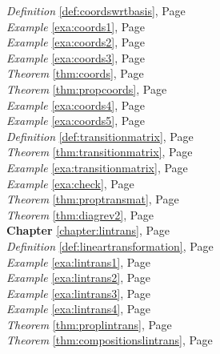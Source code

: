 \begin{multicols}{3}
\begin{center}
      \textit{Definition} \ref{def:coordswrtbasis}, Page \pageref{def:coordswrtbasis} \\
      \textit{Example} \ref{exa:coords1}, Page \pageref{exa:coords1} \\
      \textit{Example} \ref{exa:coords2}, Page \pageref{exa:coords2} \\
      \textit{Example} \ref{exa:coords3}, Page \pageref{exa:coords3} \\
      \textit{Theorem} \ref{thm:coords}, Page \pageref{thm:coords} \\
      \textit{Theorem} \ref{thm:propcoords}, Page \pageref{thm:propcoords} \\
      \textit{Example} \ref{exa:coords4}, Page \pageref{exa:coords4} \\
      \textit{Example} \ref{exa:coords5}, Page \pageref{exa:coords5} \\
      \textit{Definition} \ref{def:transitionmatrix}, Page \pageref{def:transitionmatrix} \\
      \textit{Theorem} \ref{thm:transitionmatrix}, Page \pageref{thm:transitionmatrix} \\
      \textit{Example} \ref{exa:transitionmatrix}, Page \pageref{exa:transitionmatrix} \\
      \textit{Example} \ref{exa:check}, Page \pageref{exa:check} \\
      \textit{Theorem} \ref{thm:proptransmat}, Page \pageref{thm:proptransmat} \\
      \textit{Theorem} \ref{thm:diagrev2}, Page \pageref{thm:diagrev2} \\
      \textbf{Chapter} \ref{chapter:lintrans}, Page \pageref{chapter:lintrans} \\
      \textit{Definition} \ref{def:lineartransformation}, Page \pageref{def:lineartransformation} \\
      \textit{Example} \ref{exa:lintrans1}, Page \pageref{exa:lintrans1} \\
      \textit{Example} \ref{exa:lintrans2}, Page \pageref{exa:lintrans2} \\
      \textit{Example} \ref{exa:lintrans3}, Page \pageref{exa:lintrans3} \\
      \textit{Example} \ref{exa:lintrans4}, Page \pageref{exa:lintrans4} \\
      \textit{Theorem} \ref{thm:proplintrans}, Page \pageref{thm:proplintrans} \\
      \textit{Theorem} \ref{thm:compositionslintrans}, Page \pageref{thm:compositionslintrans} \\

\end{center}
\end{multicols}
